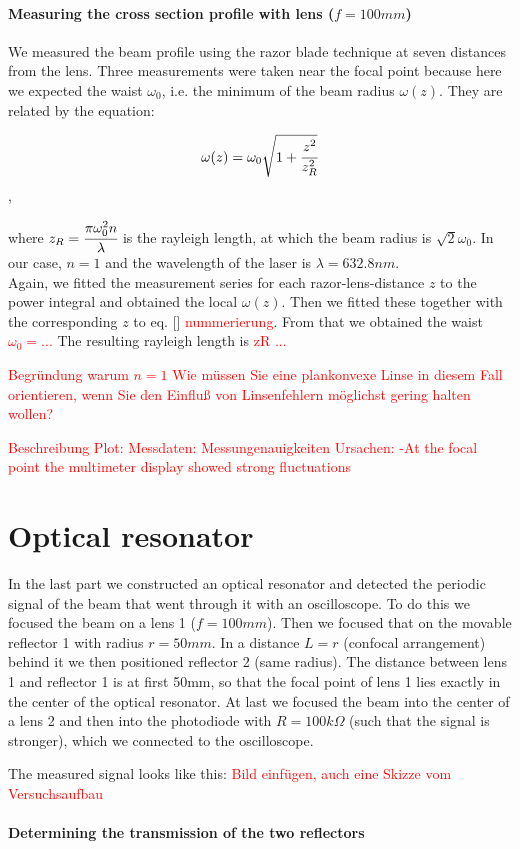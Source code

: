 \documentclass{article}
\begin{document}
\paragraph{Measuring the cross section profile with lens ($f=100mm$)}

We measured the beam profile using the razor blade technique at seven distances from the lens. Three measurements were taken near the focal point because here we expected the waist $\omega_{0}$, i.e. the minimum of the beam radius $\omega (z)$. They are related by the equation:

\[ \omega (z) = \omega_{0}\sqrt{1+\cfrac{z^2}{z_{R}^2}} \],

where $z_{R} = \cfrac{\pi\omega_{0}^2 n}{\lambda} $ is the rayleigh length, at which the beam radius is $\sqrt{2}\omega_{0}$. In our case, $n=1$ and the wavelength of the laser is $\lambda = 632.8 nm$.\\

Again, we fitted the measurement series for each razor-lens-distance $z$ to the power integral and obtained the local $\omega(z)$. Then we fitted these together with the corresponding $z$ to eq. []
\textcolor{red}{nummerierung}.
From that we obtained the waist 
\textcolor{red}{$\omega_{0} = ...$ }
The resulting rayleigh length is 
\textcolor{red}{zR ...}

\textcolor{red}{
Begründung warum $n=1$
Wie müssen Sie eine plankonvexe Linse in diesem Fall orientieren, wenn Sie den Einfluß von Linsenfehlern möglichst gering halten wollen?}

\textcolor{red}{
Beschreibung Plot:
Messdaten:
Messungenauigkeiten Ursachen:
-At the focal point the multimeter display showed strong fluctuations}

\section{Optical resonator}

In the last part we constructed an optical resonator and detected the periodic signal of the beam that went through it with an oscilloscope. To do this we focused the beam on a lens 1 ($f=100mm$). Then we focused that on the movable reflector 1 with radius $r = 50mm$. In a distance $L=r$ (confocal arrangement) behind it we then positioned reflector 2 (same radius). The distance between lens 1 and reflector 1 is at first 50mm, so that the focal point of lens 1 lies exactly in the center of the optical resonator. At last we focused the beam into the center of a lens 2 and then into the photodiode with $R=100k\Omega$ (such that the signal is stronger), which we connected to the oscilloscope.

The measured signal looks like this:
\textcolor{red}{Bild einfügen, auch eine Skizze vom Versuchsaufbau}

\paragraph{Determining the transmission of the two reflectors}
\end{document}
